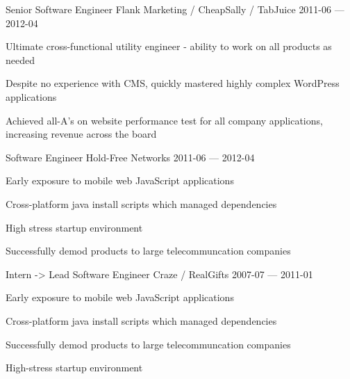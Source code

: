\begin{cventries}
  \cventry
    {Senior Software Engineer} %
    {Flank Marketing / CheapSally / TabJuice} %
    {} %
    {2011-06 — 2012-04} %
    {
      \begin{cvitems} %
        \item {Ultimate cross-functional utility engineer - ability to work on all products as needed}
        \item {Despite no experience with CMS, quickly mastered highly complex WordPress applications}
        \item {Achieved all-A's on website performance test for all company applications, increasing revenue across the board}
      \end{cvitems}
    }


  \cventry
    {Software Engineer} %
    {Hold-Free Networks} %
    {} %
    {2011-06 — 2012-04} %
    {
      \begin{cvitems} %
        \item {Early exposure to mobile web JavaScript applications}
        \item {Cross-platform java install scripts which managed dependencies}
        \item {High stress startup environment}
        \item {Successfully demod products to large telecommuncation companies}
      \end{cvitems}
    }


  \cventry
    {Intern -> Lead Software Engineer} %
    {Craze / RealGifts} %
    {} %
    {2007-07 — 2011-01} %
    {
      \begin{cvitems} %
        \item {Early exposure to mobile web JavaScript applications}
        \item {Cross-platform java install scripts which managed dependencies}
        \item {Successfully demod products to large telecommuncation companies}
        \item {High-stress startup environment}
      \end{cvitems}
    }


\end{cventries}

